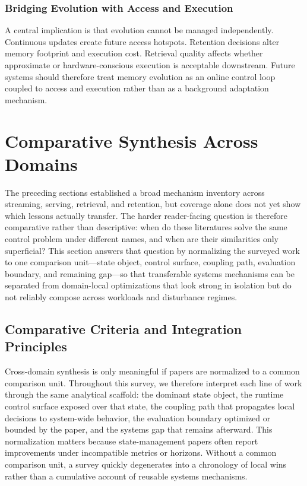 \documentclass[acmsmall,screen,review]{acmart}
\begin{document}
\subsubsection{Bridging Evolution with Access and Execution}

A central implication is that evolution cannot be managed independently. Continuous updates create future access hotspots. Retention decisions alter memory footprint and execution cost. Retrieval quality affects whether approximate or hardware-conscious execution is acceptable downstream. Future systems should therefore treat memory evolution as an online control loop coupled to access and execution rather than as a background adaptation mechanism.

\section{Comparative Synthesis Across Domains}
\label{sec:comparative-synthesis}

The preceding sections established a broad mechanism inventory across streaming, serving, retrieval, and retention, but coverage alone does not yet show which lessons actually transfer. The harder reader-facing question is therefore comparative rather than descriptive: when do these literatures solve the same control problem under different names, and when are their similarities only superficial? This section answers that question by normalizing the surveyed work to one comparison unit---state object, control surface, coupling path, evaluation boundary, and remaining gap---so that transferable systems mechanisms can be separated from domain-local optimizations that look strong in isolation but do not reliably compose across workloads and disturbance regimes.

\subsection{Comparative Criteria and Integration Principles}

Cross-domain synthesis is only meaningful if papers are normalized to a common comparison unit. Throughout this survey, we therefore interpret each line of work through the same analytical scaffold: the dominant state object, the runtime control surface exposed over that state, the coupling path that propagates local decisions to system-wide behavior, the evaluation boundary optimized or bounded by the paper, and the systems gap that remains afterward. This normalization matters because state-management papers often report improvements under incompatible metrics or horizons. Without a common comparison unit, a survey quickly degenerates into a chronology of local wins rather than a cumulative account of reusable systems mechanisms.
\end{document}
